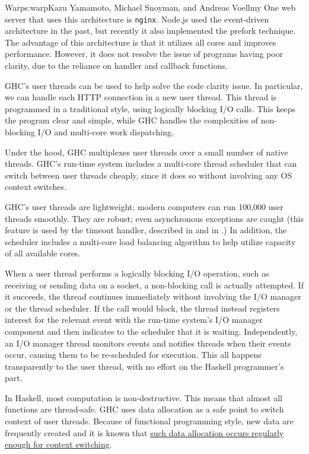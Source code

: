 \begin{aosachapter}{Warp}{s:warp}{Kazu Yamamoto, Michael Snoyman, and Andreas Voellmy}
One web server that uses this architecture is \texttt{nginx}. Node.js
used the event-driven architecture in the past, but recently it also
implemented the prefork technique. The advantage of this architecture is
that it utilizes all cores and improves performance. However, it does
not resolve the issue of programs having poor clarity, due to the
reliance on handler and callback functions.


GHC's user threads can be used to help solve the code clarity issue. In
particular, we can handle each HTTP connection in a new user thread.
This thread is programmed in a traditional style, using logically
blocking I/O calls. This keeps the program clear and simple, while GHC
handles the complexities of non-blocking I/O and multi-core work
dispatching.

Under the hood, GHC multiplexes user threads over a small number of
native threads. GHC's run-time system includes a multi-core thread
scheduler that can switch between user threads cheaply, since it does so
without involving any OS context switches.

GHC's user threads are lightweight; modern computers can run 100,000
user threads smoothly. They are robust; even asynchronous exceptions are
caught (this feature is used by the timeout handler, described in
 and in .) In
addition, the scheduler includes a multi-core load balancing algorithm
to help utilize capacity of all available cores.

When a user thread performs a logically blocking I/O operation, such as
receiving or sending data on a socket, a non-blocking call is actually
attempted. If it succeeds, the thread continues immediately without
involving the I/O manager or the thread scheduler. If the call would
block, the thread instead registers interest for the relevant event with
the run-time system's I/O manager component and then indicates to the
scheduler that it is waiting. Independently, an I/O manager thread
monitors events and notifies threads when their events occur, causing
them to be re-scheduled for execution. This all happens transparently to
the user thread, with no effort on the Haskell programmer's part.

In Haskell, most computation is non-destructive. This means that almost
all functions are thread-safe. GHC uses data allocation as a safe point
to switch context of user threads. Because of functional programming
style, new data are frequently created and it is known that
\href{http://www.aosabook.org/en/ghc.html}{such data allocation occurs
regularly enough for context switching}.


\end{aosachapter}
